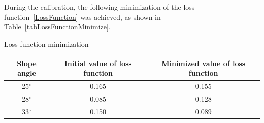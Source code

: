 \documentclass[applsci,article,submit,moreauthors,pdftex]{Definitions/mdpi}
\begin{document}
\begin{paracol}{2}
\linenumbers
\switchcolumn

During the calibration, the following minimization of the loss function~\eqref{LossFunction} was achieved, as shown in Table~\ref{tabLossFunctionMinimize}.

\begin{specialtable}[H] 
    \caption{Loss function minimization\label{tabLossFunctionMinimize}}
    \begin{tabular}{  c  c  c  }
    \toprule
    \textbf{Slope angle} & \textbf{Initial value of loss function} & \textbf{Minimized value of loss function}\\
    \midrule
    25$^\circ$ & 0.165 & 0.155\\
    28$^\circ$ & 0.085 & 0.128\\
    33$^\circ$ & 0.150 & 0.089\\
    \bottomrule
    \end{tabular}
\end{specialtable}


\end{paracol}
\end{document}
